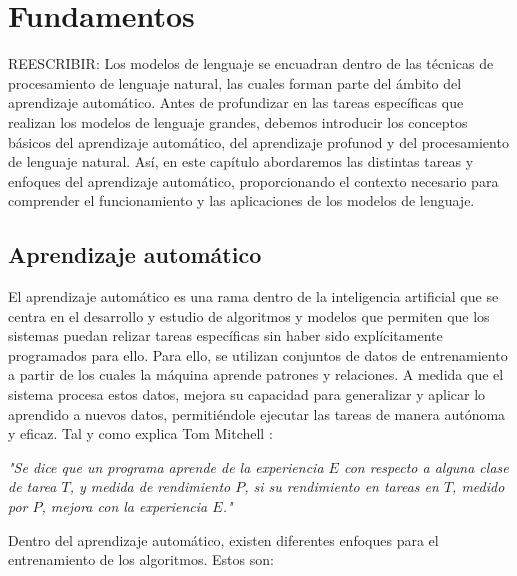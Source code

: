 \documentclass[11pt,spanish,listoffigures,listoftables]{tfgetsinf}
\begin{document}
\chapter{Fundamentos}\label{capitulo:fundamentos}

REESCRIBIR: Los modelos de lenguaje se encuadran dentro de las técnicas de procesamiento de lenguaje natural, las cuales forman parte del ámbito del aprendizaje automático. Antes de profundizar en las tareas específicas que realizan los modelos de lenguaje grandes, debemos introducir los conceptos básicos del aprendizaje automático, del aprendizaje profunod y del procesamiento de lenguaje natural. Así, en este capítulo abordaremos las distintas tareas y enfoques del aprendizaje automático, proporcionando el contexto necesario para comprender el funcionamiento y las aplicaciones de los modelos de lenguaje.

\section{Aprendizaje automático}

El aprendizaje automático es una rama dentro de la inteligencia artificial que se centra en el desarrollo y estudio de algoritmos y modelos que permiten que los sistemas puedan relizar tareas específicas sin haber sido explícitamente programados para ello. Para ello, se utilizan conjuntos de datos de entrenamiento a partir de los cuales la máquina aprende patrones y relaciones. A medida que el sistema procesa estos datos, mejora su capacidad para generalizar y aplicar lo aprendido a nuevos datos, permitiéndole ejecutar las tareas de manera autónoma y eficaz. Tal y como explica Tom Mitchell \cite{mitchell1997mcgraw}:

\textit{"Se dice que un programa aprende de la experiencia $E$ con respecto a alguna clase de tarea $T$, y medida de rendimiento $P$, si su rendimiento en tareas en $T$, medido por $P$, mejora con la experiencia $E$."}

Dentro del aprendizaje automático, existen diferentes enfoques para el entrenamiento de los algoritmos. Estos son:
\end{document}
